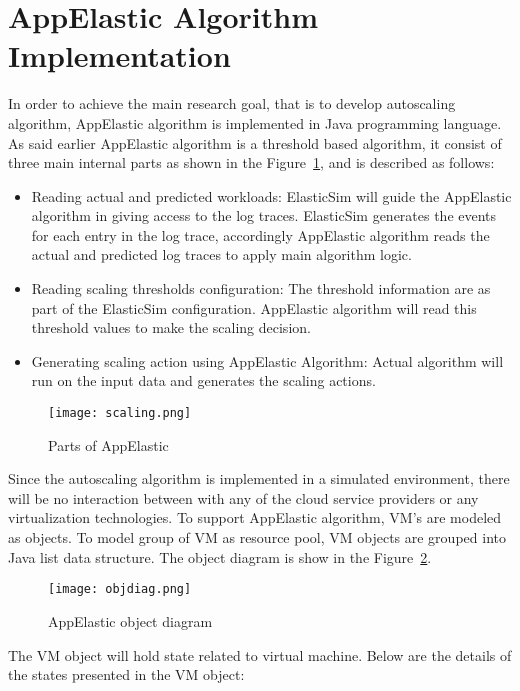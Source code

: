 \section{AppElastic Algorithm Implementation}
\label{sec:AppElastic Algorithm Implementation}
In order to achieve the main research goal, that is to develop autoscaling algorithm, AppElastic algorithm is implemented in Java programming language. As said earlier AppElastic algorithm is a threshold based algorithm, it consist of three main internal parts as shown in the Figure~\ref{figure:appelasticparts}, and is described as follows:
\begin{itemize}
  \item Reading actual and predicted workloads: ElasticSim will guide the AppElastic algorithm in giving access to the log traces. ElasticSim generates the events for each entry in the log trace, accordingly AppElastic algorithm reads the actual and predicted log traces to apply main algorithm logic.
  \item  Reading scaling thresholds configuration: The threshold information are as part of the ElasticSim configuration. AppElastic algorithm will read this threshold values to make the scaling decision.
  \item Generating scaling action using AppElastic Algorithm: Actual algorithm will run on the input data and generates the scaling actions.
\end{itemize}
\begin{figure}[h]
  \begin{center}
    \texttt{[image: scaling.png]}
    \caption{Parts of AppElastic}
    \label{figure:appelasticparts}
  \end{center}
\end{figure}
Since the autoscaling algorithm is implemented in a simulated environment, there will be no interaction between with any of the cloud service providers or any virtualization technologies. To support AppElastic algorithm, VM's are modeled as objects. To model group of VM as resource pool, VM objects are grouped into Java list data structure. The object diagram is show in the Figure~\ref{figure:objdiag}.
\begin{figure}[h]
  \begin{center}
    \texttt{[image: objdiag.png]}
    \caption{AppElastic object diagram}
    \label{figure:objdiag}
  \end{center}
\end{figure}
The VM object will hold state related to virtual machine. Below are the details of the states presented in the VM object:

